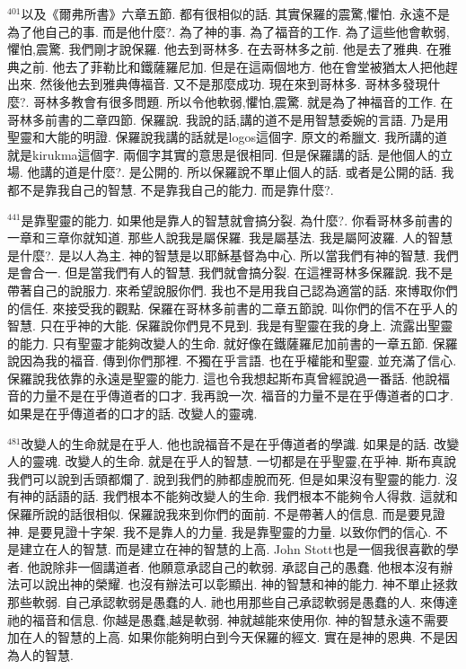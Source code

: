 \documentclass{book}
\begin{document}
$^{401}$以及《爾弗所書》六章五節.
都有很相似的話.
其實保羅的震驚,懼怕.
永遠不是為了他自己的事.
而是他什麼?.
為了神的事.
為了福音的工作.
為了這些他會軟弱,懼怕,震驚.
我們剛才說保羅.
他去到哥林多.
在去哥林多之前.
他是去了雅典.
在雅典之前.
他去了菲勒比和鐵薩羅尼加.
但是在這兩個地方.
他在會堂被猶太人把他趕出來.
然後他去到雅典傳福音.
又不是那麼成功.
現在來到哥林多.
哥林多發現什麼?.
哥林多教會有很多問題.
所以令他軟弱,懼怕,震驚.
就是為了神福音的工作.
在哥林多前書的二章四節.
保羅說.
我說的話,講的道不是用智慧委婉的言語.
乃是用聖靈和大能的明證.
保羅說我講的話就是logos這個字.
原文的希臘文.
我所講的道就是kirukma這個字.
兩個字其實的意思是很相同.
但是保羅講的話.
是他個人的立場.
他講的道是什麼?.
是公開的.
所以保羅說不單止個人的話.
或者是公開的話.
我都不是靠我自己的智慧.
不是靠我自己的能力.
而是靠什麼?.

$^{441}$是靠聖靈的能力.
如果他是靠人的智慧就會搞分裂.
為什麼?.
你看哥林多前書的一章和三章你就知道.
那些人說我是屬保羅.
我是屬基法.
我是屬阿波羅.
人的智慧是什麼?.
是以人為主.
神的智慧是以耶穌基督為中心.
所以當我們有神的智慧.
我們是會合一.
但是當我們有人的智慧.
我們就會搞分裂.
在這裡哥林多保羅說.
我不是帶著自己的說服力.
來希望說服你們.
我也不是用我自己認為適當的話.
來博取你們的信任.
來接受我的觀點.
保羅在哥林多前書的二章五節說.
叫你們的信不在乎人的智慧.
只在乎神的大能.
保羅說你們見不見到.
我是有聖靈在我的身上.
流露出聖靈的能力.
只有聖靈才能夠改變人的生命.
就好像在鐵薩羅尼加前書的一章五節.
保羅說因為我的福音.
傳到你們那裡.
不獨在乎言語.
也在乎權能和聖靈.
並充滿了信心.
保羅說我依靠的永遠是聖靈的能力.
這也令我想起斯布真曾經說過一番話.
他說福音的力量不是在乎傳道者的口才.
我再說一次.
福音的力量不是在乎傳道者的口才.
如果是在乎傳道者的口才的話.
改變人的靈魂.

$^{481}$改變人的生命就是在乎人.
他也說福音不是在乎傳道者的學識.
如果是的話.
改變人的靈魂.
改變人的生命.
就是在乎人的智慧.
一切都是在乎聖靈,在乎神.
斯布真說我們可以說到舌頭都爛了.
說到我們的肺都虛脫而死.
但是如果沒有聖靈的能力.
沒有神的話語的話.
我們根本不能夠改變人的生命.
我們根本不能夠令人得救.
這就和保羅所說的話很相似.
保羅說我來到你們的面前.
不是帶著人的信息.
而是要見證神.
是要見證十字架.
我不是靠人的力量.
我是靠聖靈的力量.
以致你們的信心.
不是建立在人的智慧.
而是建立在神的智慧的上高.
John Stott也是一個我很喜歡的學者.
他說除非一個講道者.
他願意承認自己的軟弱.
承認自己的愚蠢.
他根本沒有辦法可以說出神的榮耀.
也沒有辦法可以彰顯出.
神的智慧和神的能力.
神不單止拯救那些軟弱.
自己承認軟弱是愚蠢的人.
祂也用那些自己承認軟弱是愚蠢的人.
來傳達祂的福音和信息.
你越是愚蠢,越是軟弱.
神就越能來使用你.
神的智慧永遠不需要加在人的智慧的上高.
如果你能夠明白到今天保羅的經文.
實在是神的恩典.
不是因為人的智慧.
\end{document}
